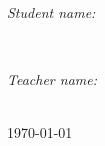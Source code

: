 \begin{titlepage}
    \begin{minipage}[t]{0.4\textwidth}
    \begin{flushleft} \large
    \emph{Student name: }\\
    \studentname
    \end{flushleft}
    \end{minipage}
    ~
    \begin{minipage}[t]{0.4\textwidth}
    \begin{flushright} \Large
    \emph{Teacher name: } \\
    \teachername
    \end{flushright}
    \end{minipage} \\[4.2cm]
    {\large \today} \\[0.4cm]
    \vfill
    
\end{titlepage}